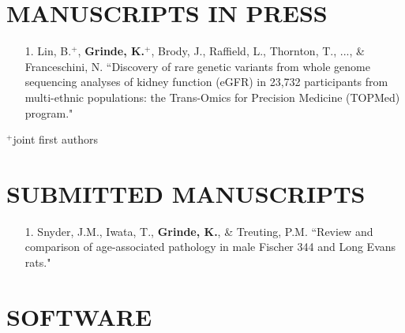 \documentclass[margin]{res}
\newenvironment{benumerate}[1]{
    \let\oldItem\item
    \def\item{\addtocounter{enumi}{-2}\oldItem}
    
    \begin{enumerate}
    \setcounter{enumi}{#1}
    \addtocounter{enumi}{1}
}{
    \end{enumerate}
}
\begin{document}
\begin{resume}
\section{MANUSCRIPTS IN PRESS}
\begin{itemize}
\item[1.] Lin, B.$^{+}$, \textbf{Grinde, K.}$^{+}$, Brody, J., Raffield, L., Thornton, T., ..., \& Franceschini, N. ``Discovery of rare genetic variants from whole genome sequencing analyses  of kidney function (eGFR) in 23,732 participants from multi-ethnic populations: the Trans-Omics for Precision Medicine (TOPMed) program." 
\end{itemize}

$^{+}$joint first authors

\section{SUBMITTED MANUSCRIPTS}
\begin{itemize}
\item[1.] Snyder, J.M., Iwata, T., \textbf{Grinde, K.}, \& Treuting, P.M. 
``Review and comparison of age-associated pathology in male Fischer 344 and Long Evans rats."  \\
\end{itemize}






\section{SOFTWARE} 


\end{resume}
\end{document}
